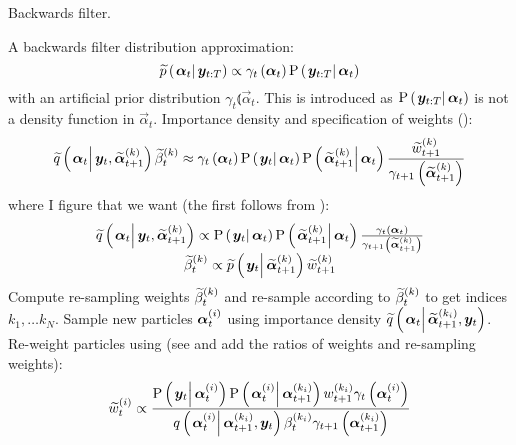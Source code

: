 \begin{algorithm}
\caption{Backwards filter.}\label{alg:backward}
\begin{algorithmic}[1]\raggedright
\INPUT
\Statex A backwards filter distribution approximation:
\begin{equation}
	\propAproxC{\vec{\alpha}_t}{\vec{y}_{t:T}} \propto \gamma_t \Lparen{\vec{\alpha}_t}\propC{\vec{y}_{t:T}}{\vec{\alpha}_t}
\end{equation} 
\Statex with an  artificial prior distribution $\gamma_t \Lparen{\vec{\alpha}_t}$. This is introduced as $\propC{\vec{y}_{t:T}}{\vec{\alpha}_t}$ is not a density function in $\vec{\alpha}_t$.
\Statex Importance density and specification of weights {\footnotesize (\citet[page 451  -- maybe look in the example in the appendix]{fearnhead10})}:
\Statex\begin{equation}
	\IDAproxC{\vec{\alpha}_t}{\vec{y}_t, \particB{\vec{\alpha}}{t + 1}{k}}\particB{\beta}{t}{k} \approx %
		\gamma_t\Lparen{\vec{\alpha}_t}
		\propC{\vec{y}_t}{\vec{\alpha}_t}
		\propC{\particB{\vec{\alpha}}{t + 1}{k}}{\vec{\alpha}_t}
		\frac{\particB{w}{t + 1}{k}}{\gamma_{t + 1}\Lparen{\particB{\vec{\alpha}}{t + 1}{k}}}
\end{equation}
\Statex where I figure that we want {\footnotesize (the first follows from \citet[page 74]{briers10})}:
\Statex\begin{equation}\begin{matrix}
	\IDAproxC{\vec{\alpha}_t}{\vec{y}_t, \particB{\vec{\alpha}}{t + 1}{k}} \propto %
		\propC{\vec{y}_t}{\vec{\alpha}_t}
		\propC{\particB{\vec{\alpha}}{t + 1}{k}}{\vec{\alpha}_t}
		\frac{\gamma_t\Lparen{\vec{\alpha}_t}}{\gamma_{t + 1}\Lparen{\particB{\vec{\alpha}}{t + 1}{k}}} \\
	\particB{\beta}{t}{k} \propto %
		 \propAproxC{\vec{y}_t}{\particB{\vec{\alpha}}{t + 1}{k}}\particB{w}{t + 1}{k}
\end{matrix}\end{equation}
\State Compute re-sampling weights $\widetilde{\beta}_{t}^{\left( k\right)}$ and re-sample according to $\widetilde{\beta}_{t}^{\left( k\right)}$ to get indices $k_1,\dots k_N$.
\EndProcedure
%
\State Sample new particles $\bm{\alpha}_{t}^{\left( i\right)}$ using importance density $\IDAproxC{\vec{\alpha}_t}{\particB{\vec{\alpha}}{t + 1}{k_i}, \vec{y}_t}$.
\EndProcedure
%
\State Re-weight particles using {\footnotesize (see \citet[page 72]{briers10} and add the ratios of weights and re-sampling weights)}:
\StateX \begin{equation}\label{eqn:backwardWeight}
	\particB{w}{t}{i} \propto \frac{
		\propC{\vec{y}_t}{\partic{\vec{\alpha}}{t}{i}}
		\propC{\partic{\vec{\alpha}}{t}{i}}{\partic{\vec{\alpha}}{t + 1}{k_i}}
		\partic{w}{t + 1}{k_i}
		\gamma_t\Lparen{\partic{\vec{\alpha}}{t}{i}}
	}{ %
		\IDC{\partic{\vec{\alpha}}{t}{i}}{\partic{\vec{\alpha}}{t + 1}{k_i}, \vec{y}_t}
		\partic{\beta}{t}{k_i}
		\gamma_{t + 1}\Lparen{\partic{\vec{\alpha}}{t + 1}{k_i}}
	}
\end{equation}
\EndProcedure
\EndFor
\end{algorithmic}
\end{algorithm}
